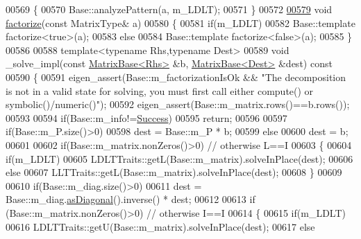 \begin{DoxyCode}
00569     \{
00570       Base::analyzePattern(a, m\_LDLT);
00571     \}
00572 
\hyperlink{group___sparse_cholesky___module_ab1b21d430cc2a8e332221313a4f2f2e3}{00579}     \textcolor{keywordtype}{void} \hyperlink{group___sparse_cholesky___module_ab1b21d430cc2a8e332221313a4f2f2e3}{factorize}(\textcolor{keyword}{const} MatrixType& a)
00580     \{
00581       \textcolor{keywordflow}{if}(m\_LDLT)
00582         Base::template factorize<true>(a);
00583       \textcolor{keywordflow}{else}
00584         Base::template factorize<false>(a);
00585     \}
00586 
00588     \textcolor{keyword}{template}<\textcolor{keyword}{typename} Rhs,\textcolor{keyword}{typename} Dest>
00589     \textcolor{keywordtype}{void} \_solve\_impl(\textcolor{keyword}{const} \hyperlink{group___core___module_class_eigen_1_1_matrix_base}{MatrixBase<Rhs>} &b, \hyperlink{group___core___module_class_eigen_1_1_matrix_base}{MatrixBase<Dest>} &dest)\textcolor{keyword}{ const}
00590 \textcolor{keyword}{    }\{
00591       eigen\_assert(Base::m\_factorizationIsOk && \textcolor{stringliteral}{"The decomposition is not in a valid state for solving, you
       must first call either compute() or symbolic()/numeric()"});
00592       eigen\_assert(Base::m\_matrix.rows()==b.rows());
00593 
00594       \textcolor{keywordflow}{if}(Base::m\_info!=\hyperlink{group__enums_gga85fad7b87587764e5cf6b513a9e0ee5ea52581b035f4b59c203b8ff999ef5fcea}{Success})
00595         \textcolor{keywordflow}{return};
00596 
00597       \textcolor{keywordflow}{if}(Base::m\_P.size()>0)
00598         dest = Base::m\_P * b;
00599       \textcolor{keywordflow}{else}
00600         dest = b;
00601 
00602       \textcolor{keywordflow}{if}(Base::m\_matrix.nonZeros()>0) \textcolor{comment}{// otherwise L==I}
00603       \{
00604         \textcolor{keywordflow}{if}(m\_LDLT)
00605           LDLTTraits::getL(Base::m\_matrix).solveInPlace(dest);
00606         \textcolor{keywordflow}{else}
00607           LLTTraits::getL(Base::m\_matrix).solveInPlace(dest);
00608       \}
00609 
00610       \textcolor{keywordflow}{if}(Base::m\_diag.size()>0)
00611         dest = Base::m\_diag.\hyperlink{group___core___module_a14235b62c90f93fe910070b4743782d0}{asDiagonal}().inverse() * dest;
00612 
00613       \textcolor{keywordflow}{if} (Base::m\_matrix.nonZeros()>0) \textcolor{comment}{// otherwise I==I}
00614       \{
00615         \textcolor{keywordflow}{if}(m\_LDLT)
00616           LDLTTraits::getU(Base::m\_matrix).solveInPlace(dest);
00617         \textcolor{keywordflow}{else}

\end{DoxyCode}
